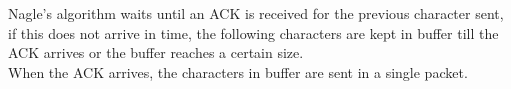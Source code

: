 Nagle's algorithm waits until an ACK is received for the previous character sent, if this does not arrive in time, the following characters are kept in buffer till the ACK arrives or the buffer reaches a certain size. \\
When the ACK arrives, the characters in buffer are sent in a single packet.\\
